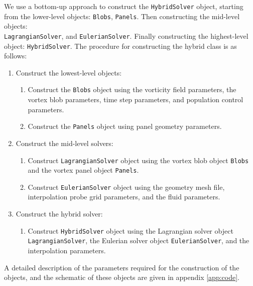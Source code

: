 We use a bottom-up approach to construct the \texttt{HybridSolver} object, starting from the lower-level objects: \texttt{Blobs}, \texttt{Panels}. Then constructing the mid-level objects: \\ \texttt{LagrangianSolver}, and \texttt{EulerianSolver}. Finally constructing the highest-level object: \texttt{HybridSolver}. The procedure for constructing the hybrid class is as follows:
\begin{enumerate}
	\item Construct the lowest-level objects:
		\begin{enumerate}
		\item Construct the \texttt{Blobs} object using the vorticity field parameters, the vortex blob parameters, time step parameters, and population control parameters.
		\item Construct the \texttt{Panels} object using panel geometry parameters.
		\end{enumerate}

	\item Construct the mid-level solvers:
		\begin{enumerate}
		\item Construct \texttt{LagrangianSolver} object using the vortex blob object \texttt{Blobs} and the vortex panel object \texttt{Panels}.
		\item Construct \texttt{EulerianSolver} object using the geometry mesh file, interpolation probe grid parameters, and the fluid parameters.
		\end{enumerate}
		
	\item Construct the hybrid solver:
		\begin{enumerate}
		\item Construct \texttt{HybridSolver} object using the Lagrangian solver object \\ \texttt{LagrangianSolver}, the Eulerian solver object \texttt{EulerianSolver}, and the interpolation parameters.
		\end{enumerate}

\end{enumerate}		

A detailed description of the parameters required for the construction of the objects, and the schematic of these objects are given in appendix \ref{app:code}.